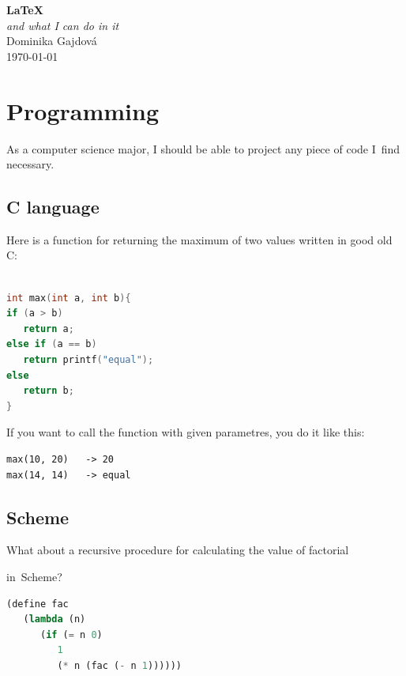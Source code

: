 \documentclass[titlepage, a4paper, 12pt]{article}
\begin{document}
\begin{titlepage}
   \begin{flushleft}
      \Huge\textbf{\LaTeX}\\
      \Large\textit{and what I can do in it}\\
      \vspace{10pt}
      \normalsize{Dominika Gajdová}\\
      \today\\
   \end{flushleft}
\end{titlepage}


\parindent=0cm

\newpage



\tableofcontents
\newpage
\section{Programming}
As a computer science major, I should be able to project any piece of code I~find necessary. 

\subsection{C language}
Here is a function for returning the maximum of two values written in good old C: 
    

\begin{lstlisting}[language = C]

int max(int a, int b){	
if (a > b)
   return a;
else if (a == b)
   return printf("equal");
else
   return b;
}
\end{lstlisting}

If you want to call the function with given parametres, you do it like this: 

\begin{lstlisting}
max(10, 20)   -> 20
max(14, 14)   -> equal
\end{lstlisting}

\subsection{Scheme}
What about a recursive procedure for calculating the value of factorial 

in~Scheme?\\


\begin{lstlisting}[language=Lisp]
(define fac
   (lambda (n)
      (if (= n 0)
         1
         (* n (fac (- n 1))))))
\end{lstlisting}
\end{document}
